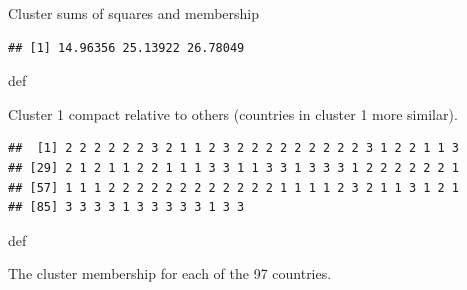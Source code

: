 \documentclass[ignorenonframetext,]{beamer}
\newenvironment{Shaded}{\begin{snugshade}}{\end{snugshade}}
\newcommand{\NormalTok}[1]{#1}
\newcommand{\OperatorTok}[1]{\textcolor[rgb]{0.81,0.36,0.00}{\textbf{#1}}}
\begin{document}
\begin{frame}[fragile]{Cluster sums of squares and membership}
\protect\hypertarget{cluster-sums-of-squares-and-membership}{}

\begin{Shaded}
\end{Shaded}

\begin{verbatim}
## [1] 14.96356 25.13922 26.78049
\end{verbatim}

def

Cluster 1 compact relative to others (countries in cluster 1 more
similar).

\begin{Shaded}
\end{Shaded}

\begin{verbatim}
##  [1] 2 2 2 2 2 2 3 2 1 1 2 3 2 2 2 2 2 2 2 2 2 3 1 2 2 1 1 3
## [29] 2 1 2 1 1 2 2 1 1 1 3 3 1 1 3 3 1 3 3 3 1 2 2 2 2 2 2 1
## [57] 1 1 1 2 2 2 2 2 2 2 2 2 2 2 2 1 1 1 1 2 3 2 1 1 3 1 2 1
## [85] 3 3 3 3 1 3 3 3 3 3 1 3 3
\end{verbatim}

def

The cluster membership for each of the 97 countries.

\end{frame}
\end{document}
